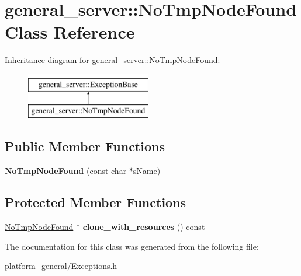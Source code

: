 \hypertarget{classgeneral__server_1_1NoTmpNodeFound}{\section{general\-\_\-server\-:\-:\-No\-Tmp\-Node\-Found \-Class \-Reference}
\label{classgeneral__server_1_1NoTmpNodeFound}
}
\-Inheritance diagram for general\-\_\-server\-:\-:\-No\-Tmp\-Node\-Found\-:\begin{figure}[H]
\begin{center}
\leavevmode
\includegraphics[height=2.000000cm]{classgeneral__server_1_1NoTmpNodeFound}
\end{center}
\end{figure}
\subsection*{\-Public \-Member \-Functions}
\begin{DoxyCompactItemize}
\item 
\hypertarget{classgeneral__server_1_1NoTmpNodeFound_a241b2a1ae26c90e549880c1e9e93930d}{{\bfseries \-No\-Tmp\-Node\-Found} (const char $\ast$s\-Name)}\label{classgeneral__server_1_1NoTmpNodeFound_a241b2a1ae26c90e549880c1e9e93930d}

\end{DoxyCompactItemize}
\subsection*{\-Protected \-Member \-Functions}
\begin{DoxyCompactItemize}
\item 
\hypertarget{classgeneral__server_1_1NoTmpNodeFound_a76a3c6704e095ae0e7ff932b0e0b5f48}{\hyperlink{classgeneral__server_1_1NoTmpNodeFound}{\-No\-Tmp\-Node\-Found} $\ast$ {\bfseries clone\-\_\-with\-\_\-resources} () const }\label{classgeneral__server_1_1NoTmpNodeFound_a76a3c6704e095ae0e7ff932b0e0b5f48}

\end{DoxyCompactItemize}


\-The documentation for this class was generated from the following file\-:\begin{DoxyCompactItemize}
\item 
platform\-\_\-general/\-Exceptions.\-h\end{DoxyCompactItemize}
